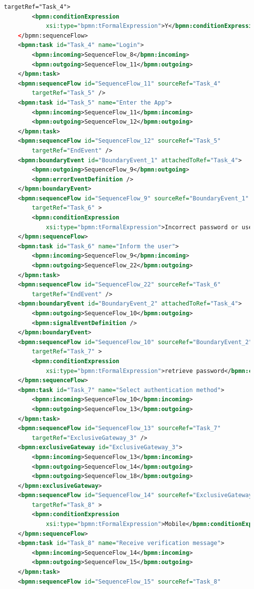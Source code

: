 \documentclass[runningheads]{llncs}
\begin{document}
\begin{lstlisting}[language={XML}]
		targetRef="Task_4">
		<bpmn:conditionExpression
			xsi:type="bpmn:tFormalExpression">Y</bpmn:conditionExpression>
	</bpmn:sequenceFlow>
	<bpmn:task id="Task_4" name="Login">
		<bpmn:incoming>SequenceFlow_8</bpmn:incoming>
		<bpmn:outgoing>SequenceFlow_11</bpmn:outgoing>
	</bpmn:task>
	<bpmn:sequenceFlow id="SequenceFlow_11" sourceRef="Task_4"
		targetRef="Task_5" />
	<bpmn:task id="Task_5" name="Enter the App">
		<bpmn:incoming>SequenceFlow_11</bpmn:incoming>
		<bpmn:outgoing>SequenceFlow_12</bpmn:outgoing>
	</bpmn:task>
	<bpmn:sequenceFlow id="SequenceFlow_12" sourceRef="Task_5"
		targetRef="EndEvent" />
	<bpmn:boundaryEvent id="BoundaryEvent_1" attachedToRef="Task_4">
		<bpmn:outgoing>SequenceFlow_9</bpmn:outgoing>
		<bpmn:errorEventDefinition />
	</bpmn:boundaryEvent>
	<bpmn:sequenceFlow id="SequenceFlow_9" sourceRef="BoundaryEvent_1"
		targetRef="Task_6" >
		<bpmn:conditionExpression
			xsi:type="bpmn:tFormalExpression">Incorrect password or username</bpmn:conditionExpression>
	</bpmn:sequenceFlow>
	<bpmn:task id="Task_6" name="Inform the user">
		<bpmn:incoming>SequenceFlow_9</bpmn:incoming>
		<bpmn:outgoing>SequenceFlow_22</bpmn:outgoing>
	</bpmn:task>
	<bpmn:sequenceFlow id="SequenceFlow_22" sourceRef="Task_6"
		targetRef="EndEvent" />
	<bpmn:boundaryEvent id="BoundaryEvent_2" attachedToRef="Task_4">
		<bpmn:outgoing>SequenceFlow_10</bpmn:outgoing>
		<bpmn:signalEventDefinition />
	</bpmn:boundaryEvent>
	<bpmn:sequenceFlow id="SequenceFlow_10" sourceRef="BoundaryEvent_2"
		targetRef="Task_7" >
		<bpmn:conditionExpression
			xsi:type="bpmn:tFormalExpression">retrieve password</bpmn:conditionExpression>
	</bpmn:sequenceFlow>
	<bpmn:task id="Task_7" name="Select authentication method">
		<bpmn:incoming>SequenceFlow_10</bpmn:incoming>
		<bpmn:outgoing>SequenceFlow_13</bpmn:outgoing>
	</bpmn:task>
	<bpmn:sequenceFlow id="SequenceFlow_13" sourceRef="Task_7"
		targetRef="ExclusiveGateway_3" />
	<bpmn:exclusiveGateway id="ExclusiveGateway_3">
		<bpmn:incoming>SequenceFlow_13</bpmn:incoming>
		<bpmn:outgoing>SequenceFlow_14</bpmn:outgoing>
		<bpmn:outgoing>SequenceFlow_18</bpmn:outgoing>
	</bpmn:exclusiveGateway>
	<bpmn:sequenceFlow id="SequenceFlow_14" sourceRef="ExclusiveGateway_3"
		targetRef="Task_8" >
		<bpmn:conditionExpression
			xsi:type="bpmn:tFormalExpression">Mobile</bpmn:conditionExpression>
	</bpmn:sequenceFlow>
	<bpmn:task id="Task_8" name="Receive verification message">
		<bpmn:incoming>SequenceFlow_14</bpmn:incoming>
		<bpmn:outgoing>SequenceFlow_15</bpmn:outgoing>
	</bpmn:task>
	<bpmn:sequenceFlow id="SequenceFlow_15" sourceRef="Task_8"

\end{lstlisting}
\end{document}
